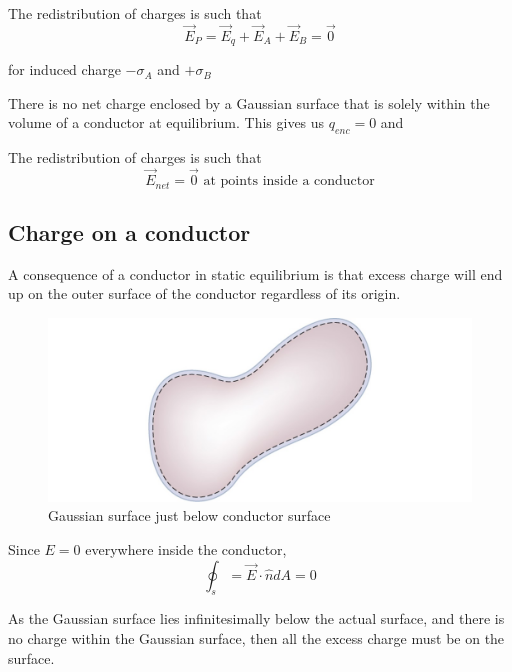 \documentclass[14pt]{memoir}
\begin{document}
The redistribution of charges is such that 
\begin{equation}
\vec{E}_P = \vec{E}_q + \vec{E}_A + \vec{E}_B = \vec{0}
\end{equation}

for induced charge $-\sigma_A$ and $+\sigma_B$

There is no net charge enclosed by a Gaussian surface that is solely within the volume of a conductor at equilibrium. This gives us $q_{enc} = 0$ and 

The redistribution of charges is such that 
\begin{equation}
\vec{E}_{net} = \vec{0} \text{   at points inside a conductor}
\end{equation}

\subsection{Charge on a conductor}

A consequence of a conductor in static equilibrium is that excess charge will end up on the outer surface of the conductor regardless of its origin.

\begin{figure}[H]
\begin{center}
\includegraphics[scale=0.40]{fig/fig_06_37.jpg}
\caption{Gaussian surface just below conductor surface}
\label{fig:06_37}
\end{center}
\end{figure}

Since $E=0$ everywhere inside the conductor, 
\begin{equation}
\oint_s = \vec{E} \cdot \hat{n}dA = 0
\end{equation}

As the Gaussian surface lies infinitesimally below the actual surface, and there is no charge within the Gaussian surface, then all the excess charge must be on the surface. 
\end{document}
